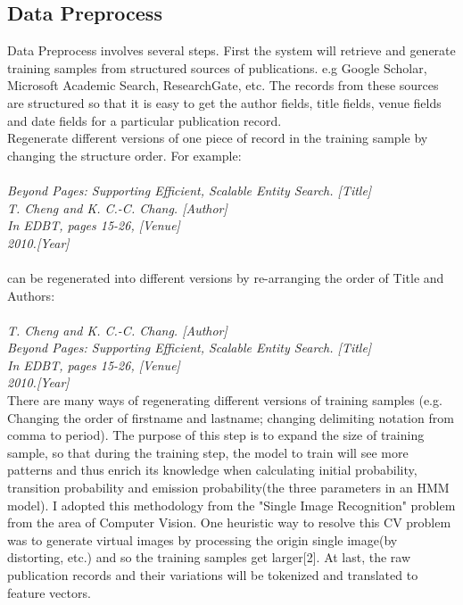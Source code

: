 \documentclass[11pt]{article}
\begin{document}
\subsection{Data Preprocess}
Data Preprocess involves several steps. First the system will retrieve and generate training samples from structured sources of publications. e.g Google Scholar, Microsoft Academic Search, ResearchGate, etc. The records from these sources are structured so that it is easy to get the author fields, title fields, venue fields and date fields for a particular publication record.\\

Regenerate different versions of one piece of record in the training sample by changing the structure order. For example:\\\\
\textit{
		Beyond Pages: Supporting Efficient, Scalable Entity Search. [Title]\\
		T. Cheng and K. C.-C. Chang. [Author] \\
		In EDBT, pages 15-26, [Venue] \\
		2010.[Year]
} \\\\
can be regenerated into different versions by re-arranging the order of Title and Authors:\\\\
\textit{
		T. Cheng and K. C.-C. Chang. [Author] \\
		Beyond Pages: Supporting Efficient, Scalable Entity Search. [Title]\\
		In EDBT, pages 15-26, [Venue] \\
		2010.[Year]
} \\

There are many ways of regenerating different versions of training samples (e.g. Changing the order of firstname and lastname; changing delimiting notation from comma to period). The purpose of this step is to expand the size of training sample, so that during the training step, the model to train will see more patterns and thus enrich its knowledge when calculating initial probability, transition probability and emission probability(the three parameters in an HMM model). I adopted this methodology from the "Single Image Recognition" problem from the area of Computer Vision. One heuristic way to resolve this CV problem was to generate virtual images by processing the origin single image(by distorting, etc.) and so the training samples get larger[2]. At last, the raw publication records and their variations will be tokenized and translated to feature vectors.
\end{document}
